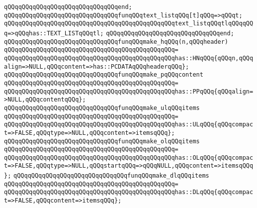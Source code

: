 \verb|qQQqqQQqqQQqqQQqqQQqqQQqqQQqqQQqend;|\newline
\newline
\verb|qQQqqQQqqQQqqQQqqQQqqQQqqQQqqQQqfunqQQqtext_listqQQq[t]qQQq=>qQQqt;|\newline
\verb|qQQqqQQqqQQqqQQqqQQqqQQqqQQqqQQqqQQqqQQqqQQqqQQqtext_listqQQqtlqQQqqQQq=>qQQqhas::TEXT_LISTqQQqtl;|\newline
\verb|qQQqqQQqqQQqqQQqqQQqqQQqqQQqqQQqend;|\newline
\newline
\verb|qQQqqQQqqQQqqQQqqQQqqQQqqQQqqQQqfunqQQqmake_hqQQq(n,qQQqheader)|\newline
\verb|qQQqqQQqqQQqqQQqqQQqqQQqqQQqqQQqqQQqqQQqqQQqqQQq=|\newline
\verb|qQQqqQQqqQQqqQQqqQQqqQQqqQQqqQQqqQQqqQQqqQQqqQQqhas::HNqQQq{qQQqn,qQQqalign=>NULL,qQQqcontent=>has::PCDATAqQQqheaderqQQq};|\newline
\newline
\verb|qQQqqQQqqQQqqQQqqQQqqQQqqQQqqQQqfunqQQqmake_pqQQqcontent|\newline
\verb|qQQqqQQqqQQqqQQqqQQqqQQqqQQqqQQqqQQqqQQqqQQqqQQq=|\newline
\verb|qQQqqQQqqQQqqQQqqQQqqQQqqQQqqQQqqQQqqQQqqQQqqQQqhas::PPqQQq{qQQqalign=>NULL,qQQqcontentqQQq};|\newline
\newline
\verb|qQQqqQQqqQQqqQQqqQQqqQQqqQQqqQQqfunqQQqmake_ulqQQqitems|\newline
\verb|qQQqqQQqqQQqqQQqqQQqqQQqqQQqqQQqqQQqqQQqqQQqqQQq=|\newline
\verb|qQQqqQQqqQQqqQQqqQQqqQQqqQQqqQQqqQQqqQQqqQQqqQQqhas::ULqQQq{qQQqcompact=>FALSE,qQQqtype=>NULL,qQQqcontent=>itemsqQQq};|\newline
\newline
\verb|qQQqqQQqqQQqqQQqqQQqqQQqqQQqqQQqfunqQQqmake_olqQQqitems|\newline
\verb|qQQqqQQqqQQqqQQqqQQqqQQqqQQqqQQqqQQqqQQqqQQqqQQq=|\newline
\verb|qQQqqQQqqQQqqQQqqQQqqQQqqQQqqQQqqQQqqQQqqQQqqQQqhas::OLqQQq{qQQqcompact=>FALSE,qQQqtype=>NULL,qQQqstartqQQq=>qQQqNULL,qQQqcontent=>itemsqQQq};|\newline
\newline
\verb|qQQqqQQqqQQqqQQqqQQqqQQqqQQqqQQqfunqQQqmake_dlqQQqitems|\newline
\verb|qQQqqQQqqQQqqQQqqQQqqQQqqQQqqQQqqQQqqQQqqQQqqQQq=|\newline
\verb|qQQqqQQqqQQqqQQqqQQqqQQqqQQqqQQqqQQqqQQqqQQqqQQqhas::DLqQQq{qQQqcompact=>FALSE,qQQqcontent=>itemsqQQq};|\newline
